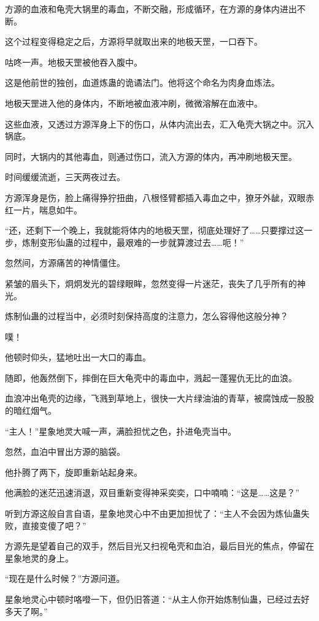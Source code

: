 \begin{this_body}
方源的血液和龟壳大锅里的毒血，不断交融，形成循环，在方源的身体内进出不断。

这个过程变得稳定之后，方源将早就取出来的地极天罡，一口吞下。

咕咚一声。地极天罡被他吞入腹中。

这是他前世的独创，血道炼蛊的诡谲法门。他将这个命名为肉身血炼法。

地极天罡进入他的身体内，不断地被血液冲刷，微微溶解在血液中。

这些血液，又透过方源浑身上下的伤口，从体内流出去，汇入龟壳大锅之中。沉入锅底。

同时，大锅内的其他毒血，则通过伤口，流入方源的体内，再冲刷地极天罡。

时间缓缓流逝，三天两夜过去。

方源浑身是伤，脸上痛得狰狞扭曲，八根怪臂都插入毒血之中，獠牙外龇，双眼赤红一片，喘息如牛。

“还，还剩下一个晚上，我就能将体内的地极天罡，彻底处理好了……只要撑过这一步，炼制变形仙蛊的过程中，最艰难的一步就算渡过去……呃！”

忽然间，方源痛苦的神情僵住。

紧皱的眉头下，炯炯发光的碧绿眼眸，忽然变得一片迷茫，丧失了几乎所有的神光。

炼制仙蛊的过程当中，必须时刻保持高度的注意力，怎么容得他这般分神？

噗！

他顿时仰头，猛地吐出一大口的毒血。

随即，他轰然倒下，摔倒在巨大龟壳中的毒血中，溅起一蓬猩仇无比的血浪。

血浪冲出龟壳的边缘，飞溅到草地上，很快一大片绿油油的青草，被腐蚀成一股股的暗红烟气。

“主人！”星象地灵大喊一声，满脸担忧之色，扑进龟壳当中。

忽然，血泊中冒出方源的脑袋。

他扑腾了两下，旋即重新站起身来。

他满脸的迷茫迅速消退，双目重新变得神采奕奕，口中喃喃：“这是……这是？”

听到方源这般自言自语，星象地灵心中不由更加担忧了：“主人不会因为炼仙蛊失败，直接变傻了吧？”

方源先是望着自己的双手，然后目光又扫视龟壳和血泊，最后目光的焦点，停留在星象地灵的身上。

“现在是什么时候？”方源问道。

星象地灵心中顿时咯噔一下，但仍旧答道：“从主人你开始炼制仙蛊，已经过去好多天了啊。”


\end{this_body}
